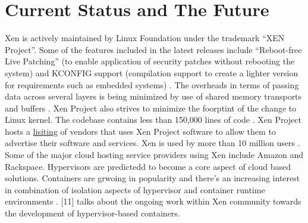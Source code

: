 \documentclass[9pt,twocolumn,twoside]{../../styles/osajnl}
\begin{document}
\section{Current Status and The Future}

Xen is actively maintained by Linux Foundation under the trademark “XEN Project”. Some of the features included in the latest releases include “Reboot-free Live Patching” (to enable application of security patches without rebooting the system) and KCONFIG support (compilation support to create a lighter version for requirements such as embedded systems) \cite{www-xen-4.7-feature-list}. The overheads in terms of passing data across several layers is being minimized by use of shared memory transports and buffers \cite{www-tech-comparison}. Xen Project also strives to minimize the foorptint of the change to Linux kernel. The codebase contains less than 150,000 lines of code \cite{www-xen-wiki}. Xen Project hosts a \href{https://xenproject.org/directory/directory.html} {lisiting} of vendors that uses Xen Project software to allow them to advertise their software and services. Xen is used by more than 10 million users \cite{www-hypervisor-17} . Some of the major cloud hosting service providers using Xen include Amazon and Rackspace. Hypervisors are predictedd to become a core aspect of cloud based solutions. Containers are grwoing in popularity and there's an increasing interest in combination of isolation aspects of hypervisor and container runtime environments \cite{www-hypervisor-containers}. [11] talks about the ongoing work within Xen community towards the development of hypervisor-based containers.




 
\end{document}
